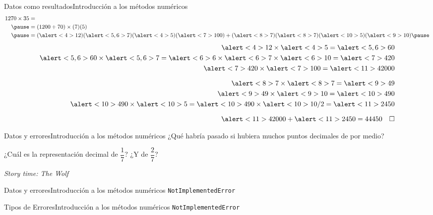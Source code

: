\documentclass[spanish, c]{beamer}
\begin{document}
\begin{frame}{Datos como resultados}{Introducción a los métodos numéricos}
    \begin{align*}
        1270 \times 35 & = \\ \pause
        & = (1200 + 70) \times (7)(5) \\ \pause
        & = (\alert<4>{12})(\alert<5,6>{7})(\alert<4>{5})(\alert<7>{100}) + (\alert<8>{7})(\alert<8>{7})(\alert<10>{5})(\alert<9>{10}) \pause
    \end{align*}
    \vspace{-2ex}
    \begin{align*}
        \alert<4>{12} \times \alert<4>{5} = \alert<5,6>{60} \\
        \alert<5,6>{60} \times \alert<5,6>{7} = \alert<6>{6} \times \alert<6>{7} \times \alert<6>{10} = \alert<7>{420} \\
        \alert<7>{420} \times \alert<7>{100} = \alert<11>{42000} \\[1.5ex]
        \alert<8>{7} \times \alert<8>{7} = \alert<9>{49} \\
        \alert<9>{49} \times \alert<9>{10} = \alert<10>{490} \\
        \alert<10>{490} \times \alert<10>{5} = \alert<10>{490} \times \alert<10>{10 / 2} = \alert<11>{2450}\\[1.5ex]
        \alert<11>{42000} + \alert<11>{2450} = 44450 \quad \square
    \end{align*}
\end{frame}

\begin{frame}{Datos y errores}{Introducción a los métodos numéricos}
    ¿Qué habría pasado si hubiera muchos puntos decimales de por medio? \pause

    \bigskip

    ¿Cuál es la representación decimal de $\dfrac{1}{7}$? ¿Y de $\dfrac{2}{7}$? \pause

    \bigskip

    \begin{center}
        \LARGE
        \textit{Story time: The Wolf}
    \end{center}    
\end{frame}

\begin{frame}{Datos y errores}{Introducción a los métodos numéricos}
    {\Huge \texttt{NotImplementedError}}
\end{frame}

\begin{frame}{Tipos de Errores}{Introducción a los métodos numéricos}
    {\Huge \texttt{NotImplementedError}}
\end{frame}
\end{document}
